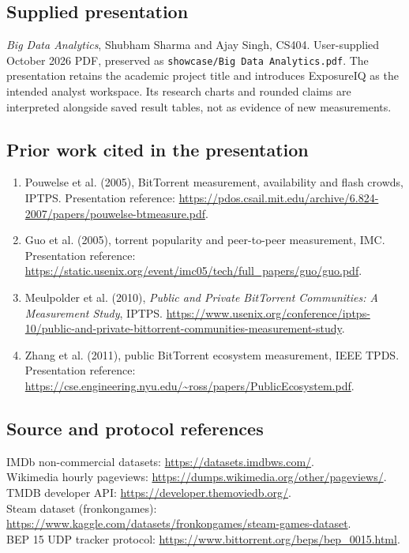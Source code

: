 \documentclass[11pt,a4paper]{article}
\begin{document}
\subsection{Supplied presentation}
\textit{Big Data Analytics}, Shubham Sharma and Ajay Singh, CS404.
User-supplied October 2026 PDF, preserved as
\texttt{showcase/Big\ Data\ Analytics.pdf}. The presentation retains the academic
project title and introduces ExposureIQ as the intended analyst workspace.
Its research charts and rounded claims are interpreted alongside saved
result tables, not as evidence of new measurements.

\subsection{Prior work cited in the presentation}
\begin{enumerate}
\item Pouwelse et al. (2005), BitTorrent measurement, availability and
flash crowds, IPTPS. Presentation reference:
\url{https://pdos.csail.mit.edu/archive/6.824-2007/papers/pouwelse-btmeasure.pdf}.
\item Guo et al. (2005), torrent popularity and peer-to-peer measurement,
IMC. Presentation reference:
\url{https://static.usenix.org/event/imc05/tech/full_papers/guo/guo.pdf}.
\item Meulpolder et al. (2010), \textit{Public and Private BitTorrent
Communities: A Measurement Study}, IPTPS.
\url{https://www.usenix.org/conference/iptps-10/public-and-private-bittorrent-communities-measurement-study}.
\item Zhang et al. (2011), public BitTorrent ecosystem measurement,
IEEE TPDS. Presentation reference:
\url{https://cse.engineering.nyu.edu/~ross/papers/PublicEcosystem.pdf}.
\end{enumerate}

\subsection{Source and protocol references}
IMDb non-commercial datasets: \url{https://datasets.imdbws.com/}.\\
Wikimedia hourly pageviews: \url{https://dumps.wikimedia.org/other/pageviews/}.\\
TMDB developer API: \url{https://developer.themoviedb.org/}.\\
Steam dataset (fronkongames):
\url{https://www.kaggle.com/datasets/fronkongames/steam-games-dataset}.\\
BEP 15 UDP tracker protocol:
\url{https://www.bittorrent.org/beps/bep_0015.html}.
\end{document}
